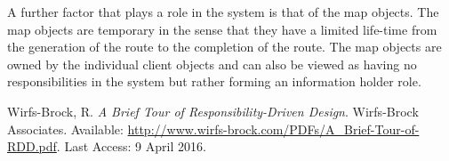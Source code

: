 \documentclass[10pt, a4paper, onecolumn]{scrartcl}
\begin{document}
		A further factor that plays a role in the system is that of the map objects. The map objects are temporary in the sense that they have a limited life-time from the generation of the route to the completion of the route. The map objects are owned by the individual client objects and can also be viewed as having no responsibilities in the system but rather forming an information holder role.

	
	\begin{thebibliography}{1}
		 Wirfs-Brock, R. \textit{A Brief Tour of Responsibility-Driven Design}. Wirfs-Brock Associates. Available: \url{http://www.wirfs-brock.com/PDFs/A_Brief-Tour-of-RDD.pdf}. Last Access: 9 April 2016.
	\end{thebibliography}	
	
	
\end{document}
